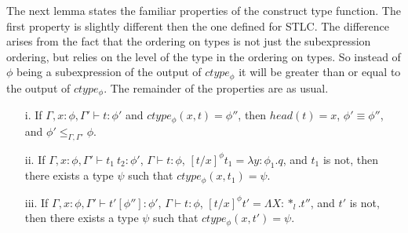 \noindent The next lemma states the familiar properties of the
construct type function.  The first property is slightly different
then the one defined for STLC.  The difference arises from the fact
that the ordering on types is not just the subexpression ordering, but
relies on the level of the type in the ordering on types.  So instead
of $\phi$ being a subexpression of the output of $ctype_\phi$ it will
be greater than or equal to the output of $ctype_\phi$.  The remainder
of the properties are as usual.

\begin{lemma}
  \label{lemma:ctype_props_ssf}
  \begin{itemize}
  \item[i.] If $\Gamma,x:\phi,\Gamma' \vdash t:\phi'$ and $ctype_\phi(x,t) = \phi''$, then 
    $head(t) = x$, $\phi' \equiv \phi''$, and $\phi' \leq_{\Gamma,\Gamma'} \phi$.

  \item[ii.] If $\Gamma,x:\phi,\Gamma' \vdash t_1\ t_2:\phi'$, $\Gamma \vdash t:\phi$,
    $[t/x]^\phi t_1 = \lambda y:\phi_1.q$, and $t_1$ is not, then there exists a type
    $\psi$ such that $ctype_\phi(x,t_1) = \psi$.

  \item[iii.] If $\Gamma,x:\phi,\Gamma' \vdash t'[\phi'']:\phi'$, $\Gamma \vdash t:\phi$,
    $[t/x]^\phi t' = \Lambda X:*_l.t''$, and $t'$ is not, then there exists a type
    $\psi$ such that $ctype_\phi(x,t') = \psi$.
  \end{itemize}
\end{lemma}
